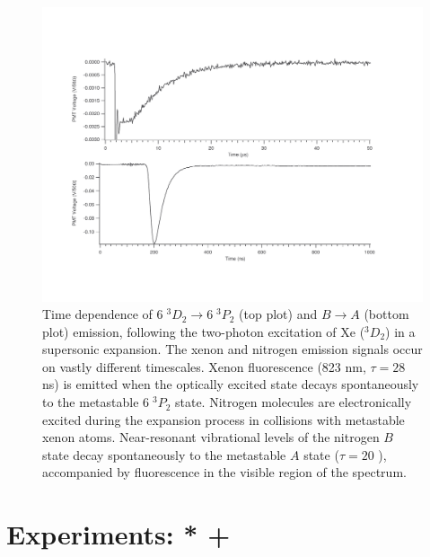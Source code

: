 \documentclass[12pt]{mitthesis}
\begin{document}
\begin{figure}
  \caption{Time dependence of  $6\;^3D_2 \rightarrow 6\;^3P_2$
    (top plot) and  $B \rightarrow A$ (bottom plot) emission,
    following the two-photon excitation of Xe ($^3D_2$) in a
    supersonic expansion.  The xenon and nitrogen emission signals
    occur on vastly different timescales.  Xenon fluorescence (823 nm,
    $\tau=28$ ns) is emitted when the optically excited state decays
    spontaneously to the metastable $6\;^3P_2$ state.  Nitrogen
    molecules are electronically excited during the expansion process
    in collisions with metastable xenon atoms.  Near-resonant
    vibrational levels of the nitrogen $B$ state decay spontaneously
    to the metastable $A$ state ($\tau=20$ \microsec), accompanied by
    fluorescence in the visible region of the spectrum. }
  \label{fig:xen2-traces}
  \centering
  \includegraphics[width=7.7in,angle=90,trim=0 0 1in 1cm ]{XeN2-traces.pdf}
\end{figure}



\section{Experiments: * + }

\end{document}
